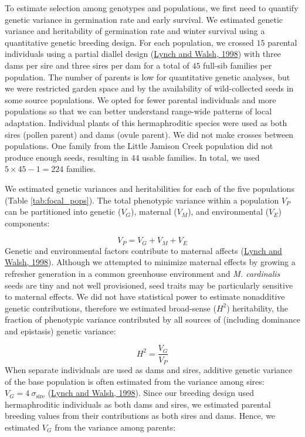 \documentclass[
  12pt,
]{article}
\begin{document}
To estimate selection among genotypes and populations, we first need to quantify genetic variance in germination rate and early survival. We estimated genetic variance and heritability of germination rate and winter survival using a quantitative genetic breeding design. For each population, we crossed \(15\) parental individuals using a partial diallel design (\protect\hyperlink{ref-lynch_genetics_1998}{Lynch and Walsh, 1998}) with three dams per sire and three sires per dam for a total of \(45\) full-sib families per population. The number of parents is low for quantitative genetic analyses, but we were restricted garden space and by the availability of wild-collected seeds in some source populations. We opted for fewer parental individuals and more populations so that we can better understand range-wide patterns of local adaptation. Individual plants of this hermaphroditic species were used as both sires (pollen parent) and dams (ovule parent). We did not make crosses between populations. One family from the Little Jamison Creek population did not produce enough seeds, resulting in \(44\) usable families. In total, we used \(5 \times 45 - 1 = 224\) families.

We estimated genetic variances and heritabilities for each of the five populations (Table \ref{tab:focal_pops}). The total phenotypic variance within a population \(V_P\) can be partitioned into genetic (\(V_G\)), maternal (\(V_M\)), and environmental (\(V_E\)) components:

\[V_P = V_G + V_M + V_E\]
Genetic and environmental factors contribute to maternal affects (\protect\hyperlink{ref-lynch_genetics_1998}{Lynch and Walsh, 1998}). Although we attempted to minimize maternal effects by growing a refresher generation in a common greenhouse environment and \emph{M. cardinalis} seeds are tiny and not well provisioned, seed traits may be particularly sensitive to maternal effects. We did not have statistical power to estimate nonadditive genetic contributions, therefore we estimated broad-sense (\(H^2\)) heritability, the fraction of phenotypic variance contributed by all sources of (including dominance and epistasis) genetic variance:

\[H ^ 2 = \frac{V_G}{V_P}\]
When separate individuals are used as dams and sires, additive genetic variance of the base population is often estimated from the variance among sires: \(V_G = 4~\sigma_{\mathrm{sire}}\) (\protect\hyperlink{ref-lynch_genetics_1998}{Lynch and Walsh, 1998}). Since our breeding design used hermaphroditic individuals as both dams and sires, we estimated parental breeding values from their contributions as both sires and dams. Hence, we estimated \(V_G\) from the variance among parents:
\end{document}
